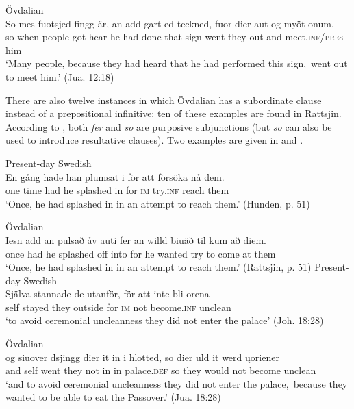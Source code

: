 \documentclass[output=paper]{langscibook}
\begin{document}
\ex Övdalian\label{ex:kalm:19b}\\
\gll So mes fuotsjed fingg är, an add gart ed teckned, fuor dier aut og myöt onum.\\
so when people got hear he had done that sign went they out and meet.\textsc{inf/pres} him\\
\glt ‘Many people, because they had heard that he had performed this sign,{~}went out to meet him.’ (Jua. 12:18)
\z 
\z 


There are also twelve instances in which Övdalian has a subordinate clause instead of a prepositional infinitive; ten of these examples are found in Rattsjin. According to \citet[491]{AkerbergNystrom2012}, both \textit{fer} and \textit{so} are purposive subjunctions (but \textit{so} can also be used to introduce resultative clauses). Two examples are given in  and .  

\ea
\label{ex:kalm:20}
\ea Present-day Swedish\label{ex:kalm:20a}\\
\gll En gång hade han plumsat i för att försöka nå dem.\\
one time had he splashed in for \textsc{im} try.\textsc{inf} reach them\\ 
\glt ‘Once, he had splashed in in an attempt to reach them.’ (Hunden, p. 51)

\ex Övdalian\label{ex:kalm:20b}\\
\gll Iesn add an pulsað åv auti fer an willd biuäð til kum að diem.\\
once had he splashed off into for he wanted try to come at them\\
\glt ‘Once, he had splashed in in an attempt to reach them.’ (Rattsjin, p. 51)
\z 
\ex
\label{ex:kalm:21}
\ea Present-day Swedish\label{ex:kalm:21a}\\ 
\gll Själva stannade de utanför, för att inte bli orena\\
self stayed they outside for \textsc{im} not become.\textsc{inf} unclean\\
\glt ‘to avoid ceremonial uncleanness they did not enter the palace’ (Joh. 18:28)

\ex Övdalian\label{ex:kalm:21b}\\
\gll og siuover dsjingg dier it in i hlotted, so dier uld it werd \k{u}oriener\\
and self went they not in in palace.\textsc{def} so they would not become unclean\\
\glt ‘and to avoid ceremonial uncleanness they did not enter the palace,{~}because they wanted to be able to eat the Passover.’ (Jua. 18:28)
\z 
\z 
\end{document}
